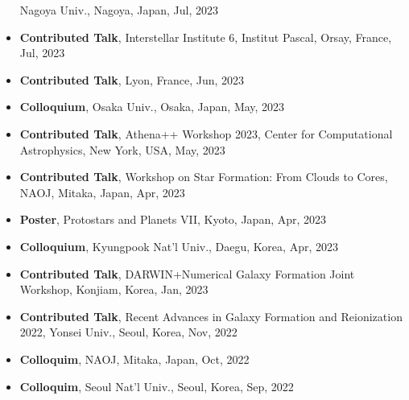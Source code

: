 \documentclass[11pt,letterpaper,roman]{moderncv}        %
\begin{document}
\begin{itemize}
  Nagoya Univ., Nagoya, Japan, Jul, 2023 %
\item \textbf{Contributed Talk},
  Interstellar Institute 6, Institut Pascal, Orsay, France, Jul, 2023 %
\item \textbf{Contributed Talk},
  Lyon, France, Jun, 2023 %
\item \textbf{Colloquium},
  Osaka Univ., Osaka, Japan, May, 2023 %
\item \textbf{Contributed Talk},
  Athena++ Workshop 2023, Center for Computational Astrophysics, New York, USA, May, 2023 %
\item \textbf{Contributed Talk},
  Workshop on Star Formation: From Clouds to Cores, NAOJ, Mitaka, Japan, Apr, 2023 %
\item \textbf{Poster},
  Protostars and Planets VII, Kyoto, Japan, Apr, 2023 %
\item \textbf{Colloquium},
  Kyungpook Nat'l Univ., Daegu, Korea, Apr, 2023 %
\item \textbf{Contributed Talk},
  DARWIN+Numerical Galaxy Formation Joint Workshop, Konjiam, Korea, Jan, 2023 %
\item \textbf{Contributed Talk},
  Recent Advances in Galaxy Formation and Reionization 2022, Yonsei Univ., Seoul, Korea, Nov, 2022 %
\item \textbf{Colloquim},
  NAOJ, Mitaka, Japan, Oct, 2022 %
\item \textbf{Colloquim},
  Seoul Nat'l Univ., Seoul, Korea, Sep, 2022 %

\end{itemize}
\end{document}
